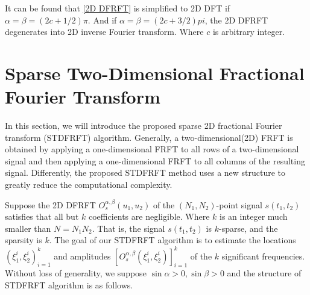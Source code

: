 \documentclass[conference]{IEEEtran}
\begin{document}
It can be found that \eqref{2D DFRFT} is simplified to 2D DFT if $ \alpha=\beta= (2c+1/2)\pi $. And if $ \alpha=\beta= (2c+3/2)pi $, the 2D DFRFT degenerates into 2D inverse Fourier transform. Where $c$ is arbitrary integer. 


\section{Sparse Two-Dimensional Fractional Fourier Transform}\label{AA}
In this section, we will introduce the proposed sparse 2D fractional Fourier transform (STDFRFT) algorithm. Generally, a two-dimensional(2D) FRFT is obtained by applying a one-dimensional FRFT to all rows of a two-dimensional signal and then applying a one-dimensional FRFT to all columns of the resulting signal. Differently, the proposed STDFRFT method uses a new structure to greatly reduce the computational complexity.

Suppose the 2D DFRFT $O_s^{\alpha ,\beta }({u_1},{u_2})$ of the $(N_1,N_2)$-point signal $s({t_1}, {t_2})$ satisfies that all but $k$ coefficients are negligible. Where $k$ is an integer much smaller than $N = {N_1}{N_2}$. That is, the signal $s({t_1}, {t_2})$ is $k$-sparse, and the sparsity is $k$. The goal of our STDFRFT algorithm is to estimate the locations $(\xi _1^i,\xi _2^i)_{i = 1}^k$ and amplitudes $[O_s^{\alpha ,\beta }(\xi _1^i,\xi _2^i)]_{i = 1}^k$ of the $k$ significant frequencies. Without loss of generality, we suppose $\sin \alpha  > 0,\sin \beta  > 0$ and the structure of STDFRFT algorithm is as follows.
\end{document}
